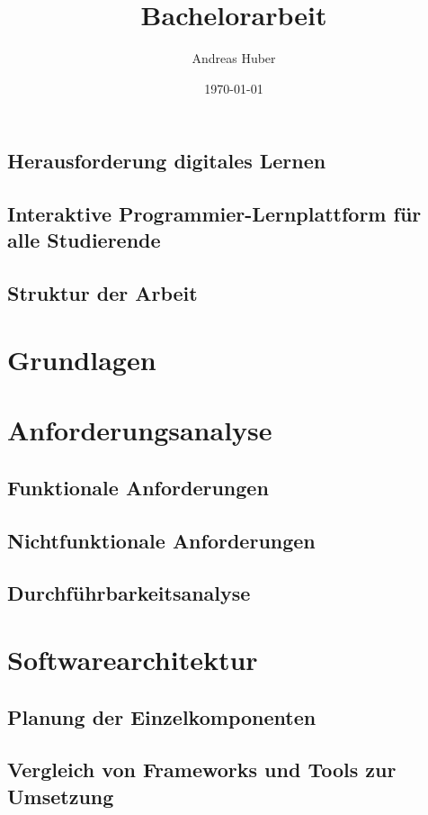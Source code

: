 \documentclass[a4paper,12pt,headsepline]{article}
\title{Bachelorarbeit}
\author{Andreas Huber}
\date{\today}
\begin{document}

\newpage


\tableofcontents
\newpage



\subsection{Herausforderung digitales Lernen}
\subsection{Interaktive Programmier-Lernplattform für alle Studierende}
\subsection{Struktur der Arbeit}
\section{Grundlagen}
\section{Anforderungsanalyse}
\subsection{Funktionale Anforderungen}
\subsection{Nichtfunktionale Anforderungen}
\subsection{Durchführbarkeitsanalyse}
\section{Softwarearchitektur}
\subsection{Planung der Einzelkomponenten}
\subsection{Vergleich von Frameworks und Tools zur Umsetzung}
\end{document}
